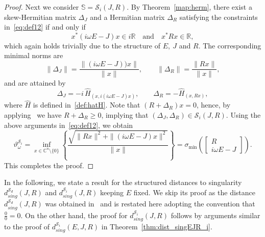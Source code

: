 \documentclass[11pt]{article}
\newcommand {\mat}[1]{\left[\begin{array}{#1}}
\newcommand {\rix}{\end{array}\right]}
\newcommand{\C}{\mathbb C}
\begin{document}
\begin{proof}
    Next we consider $\mathbb S=\mathcal S_i(J,R)$. By Theorem~\ref{map:herm}, there exist a skew-Hermitian matrix $\Delta_J$ and a Hermitian matrix $\Delta_R$ satisfying the constraints in~\eqref{eq:def12} if and only if
    \[
    x^* (i\omega E - J)x \in i\mathbb{R}
    \quad \text{and} \quad
    x^* R x \in \mathbb{R},
    \]
    which again holds trivially due to the structure of $E,~J$ and $R$.
    The corresponding minimal norms are
    \[
    \|\Delta_J\| = \frac{\|(i\omega E - J)) x\|}{\|x\|},
    \qquad
    \|\Delta_R\| = \frac{\|R x\|}{\|x\|},
    \]
    and are attained by
    \[
    \Delta_J = -i\,\hat H_{(x, i(i\omega E - J) x)},
    \qquad
    \Delta_R = -\hat H_{(x,Rx)},
    \]
    where $\hat H$ is defined in~\eqref{def:hatH}. Note that $(R+\Delta_R)x=0$, hence, by applying~\cite[Lemma 4.4]{MehMS16} we have $R+\Delta_R\geq 0$, implying that $(\Delta_J,\Delta_R)\in \mathcal S_i(J,R)$. Using the above arguments in~\eqref{eq:def12}, we obtain
    \begin{equation*}
		\vartheta^{\mathcal S_i}_{\omega} = \inf_{x\in\C^{n}\setminus\{0\}} \left\{ \frac{\sqrt{\|Rx\|^2+\|(i\omega E - J)x\|^2}}{\|x\|}\right\} = \sigma_{\min}\left(\mat{c}R\\i\omega E - J \rix\right).
	\end{equation*}
    This completes the proof.
\end{proof}
%
 In the following, we state a result for the structured distances to singularity $d_{sing}^{\mathcal S_d}(J,R)$ and $d_{sing}^{\mathcal S_i}(J,R)$ keeping $E$ fixed. We skip its proof as the distance $d_{sing}^{\mathcal S_d}(J,R)$ was obtained in~\cite[Table A.1]{PraS22} and is restated here adopting the convention that $\frac{0}{0}=0$. On the other hand, the proof for $d_{sing}^{\mathcal S_i}(J,R)$ follows by arguments similar to the proof of $d_{sing}^{\mathcal S_i}(E,J,R)$ in Theorem~\ref{thm:dist_singEJR_i}.
\end{document}
